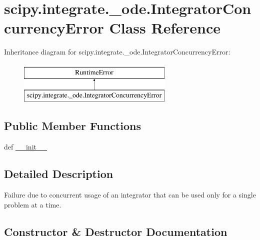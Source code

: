 \hypertarget{classscipy_1_1integrate_1_1__ode_1_1IntegratorConcurrencyError}{}\section{scipy.\+integrate.\+\_\+ode.\+Integrator\+Concurrency\+Error Class Reference}
\label{classscipy_1_1integrate_1_1__ode_1_1IntegratorConcurrencyError}
Inheritance diagram for scipy.\+integrate.\+\_\+ode.\+Integrator\+Concurrency\+Error\+:\begin{figure}[H]
\begin{center}
\leavevmode
\includegraphics[height=2.000000cm]{classscipy_1_1integrate_1_1__ode_1_1IntegratorConcurrencyError}
\end{center}
\end{figure}
\subsection*{Public Member Functions}
\begin{DoxyCompactItemize}
\item 
def \hyperlink{classscipy_1_1integrate_1_1__ode_1_1IntegratorConcurrencyError_a52e62b39e473f525b32e98cd30ac8f9b}{\+\_\+\+\_\+init\+\_\+\+\_\+}
\end{DoxyCompactItemize}


\subsection{Detailed Description}
\begin{DoxyVerb}Failure due to concurrent usage of an integrator that can be used
only for a single problem at a time.\end{DoxyVerb}
 

\subsection{Constructor \& Destructor Documentation}
\hypertarget{classscipy_1_1integrate_1_1__ode_1_1IntegratorConcurrencyError_a52e62b39e473f525b32e98cd30ac8f9b}{}
